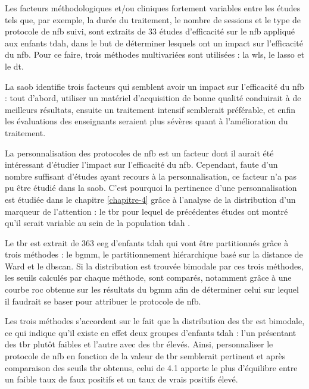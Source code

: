 Les facteurs méthodologiques et/ou cliniques fortement variables entre les études tels que, par exemple, la durée du traitement, le nombre de sessions et le type 
de protocole de \gls{nfb} suivi, sont extraits de 33 études d'efficacité sur le \gls{nfb} appliqué aux enfants \gls{tdah}, dans le but de déterminer lesquels 
ont un impact sur l'efficacité du \gls{nfb}. Pour ce faire, trois méthodes multivariées sont utilisées : la \gls{wls}, le \gls{lasso} et le \gls{dt}. 

La \gls{saob} identifie trois facteurs qui semblent avoir un impact sur l'efficacité du \gls{nfb} : tout d'abord, utiliser un matériel d'acquisition de bonne 
qualité conduirait à de meilleurs résultats, ensuite un traitement intensif semblerait préférable, et enfin les évaluations des enseignants seraient plus
sévères quant à l'amélioration du traitement. 

La personnalisation des protocoles de \gls{nfb} est un facteur dont il aurait été intéressant d'étudier l'impact sur l'efficacité du \gls{nfb}.  
Cependant, faute d'un nombre suffisant d'études ayant recours à la personnalisation, ce facteur n'a pas pu être étudié dans la \gls{saob}. C'est pourquoi
la pertinence d'une personnalisation est étudiée dans le chapitre \ref{chapitre-4} grâce à l'analyse de la distribution d'un marqueur de l'attention : le \gls{tbr} pour
lequel de précédentes études ont montré qu'il serait variable au sein de la population \gls{tdah} \citep{Zhang2017, Arns2013, Clarke2001}.

Le \gls{tbr} est extrait de 363 \gls{eeg} d'enfants \gls{tdah} qui vont être partitionnés grâce à trois méthodes : le \gls{bgmm}, le partitionnement
hiérarchique basé sur la distance de Ward et le \gls{dbscan}. Si la distribution est trouvée bimodale par ces trois méthodes, les seuils calculés par chaque méthode,
sont comparés, notamment grâce à une courbe \gls{roc} obtenue sur
les résultats du \gls{bgmm} afin de déterminer celui sur lequel il faudrait se baser pour attribuer le protocole de \gls{nfb}.

Les trois méthodes s'accordent sur le fait que la distribution des \gls{tbr} est bimodale, ce qui indique qu'il existe en effet deux groupes d'enfants
\gls{tdah} : l'un présentant des \gls{tbr} plutôt faibles et l'autre avec des \gls{tbr} élevés. Ainsi, personnaliser le protocole de \gls{nfb} en 
fonction de la valeur de \gls{tbr} semblerait pertinent et après comparaison des seuils \gls{tbr} obtenus, celui de 4.1 apporte le plus d'équilibre entre 
un faible taux de faux positifs et un taux de vrais positifs élevé.  


